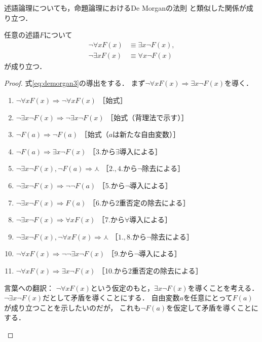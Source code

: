    述語論理についても，命題論理におけるDe Morganの法則
   と類似した関係が成り立つ．
   \begin{thm} \label{thm:demorganjutugo}
     任意の述語$F$について
     \begin{align}
       \lnot \forall x F(x) & \equiv \exists x \lnot F(x),
       \label{eq:demorgan3} \\
       \lnot \exists x F(x) & \equiv \forall x \lnot F(x)
       \label{eq:demorgan4}
     \end{align}
     が成り立つ．
   \end{thm}
   \begin{proof}
     式\eqref{eq:demorgan3}の導出をする．
     まず$\lnot \forall x F(x) \Longrightarrow \exists x \lnot F(x)$を導く．
     \begin{enumerate}[1. ]
       \item $\lnot \forall x F(x) \Longrightarrow \lnot \forall x F(x)$
              \quad ［始式］
       \item $\lnot \exists x \lnot F(x) \Longrightarrow \lnot \exists x \lnot F(x) $
              \quad ［始式（背理法で示す）］
       \item $\lnot F(a) \Longrightarrow \lnot F(a)$ \quad ［始式（$a$は新たな自由変数）］
       \item $\lnot F(a) \Longrightarrow \exists x \lnot F(x)$ 
              \quad ［3.から$\exists$導入による］
       \item $\lnot \exists x \lnot F(x) ,  \lnot F(a) 
              \Longrightarrow \curlywedge$ \quad ［$2., 4.$から$\lnot$除去による］
       \item $\lnot \exists x \lnot F(x) \Longrightarrow \lnot \lnot F(a)$
              \quad ［5.から$\lnot$導入による］
       \item $\lnot \exists x \lnot F(x) \Longrightarrow F(a)$
              \quad ［6.から2重否定の除去による］
       \item $\lnot \exists x \lnot F(x) \Longrightarrow \forall x F(x)$
              \quad ［7.から$\forall$導入による］
       \item $\lnot \exists x \lnot F(x) ,  \lnot \forall x F(x) 
              \Longrightarrow \curlywedge$ \quad ［$1., 8.$から$\lnot$除去による］
       \item $\lnot \forall x F(x) \Longrightarrow \lnot \lnot \exists x \lnot F(x)$
              \quad ［9.から$\lnot$導入による］
       \item $\lnot \forall x F(x) \Longrightarrow \exists x \lnot F(x)$
              \quad ［10.から2重否定の除去による］
     \end{enumerate}
     \begin{oframed}
       言葉への翻訳：
       $\lnot \forall x F(x) $という仮定のもと，$\exists x \lnot F(x)$を導くことを考える．
       $\lnot \exists x \lnot F(x)$だとして矛盾を導くことにする．
       自由変数$a$を任意にとって$F(a)$が成り立つことを示したいのだが，
       これも$\lnot F(a)$を仮定して矛盾を導くことにする．
       

\end{oframed}
\end{proof}
